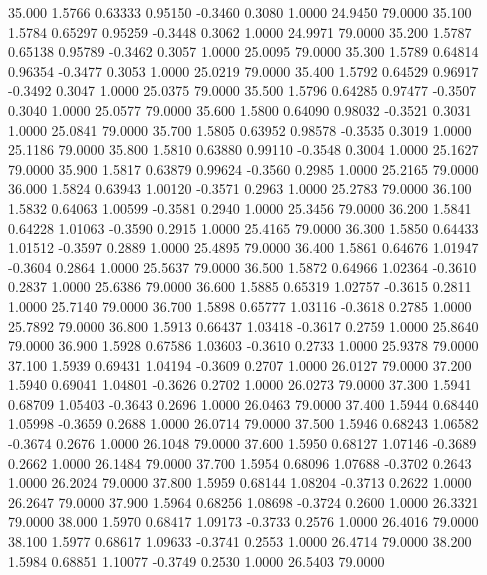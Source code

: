   35.000   1.5766   0.63333   0.95150  -0.3460   0.3080   1.0000  24.9450  79.0000
  35.100   1.5784   0.65297   0.95259  -0.3448   0.3062   1.0000  24.9971  79.0000
  35.200   1.5787   0.65138   0.95789  -0.3462   0.3057   1.0000  25.0095  79.0000
  35.300   1.5789   0.64814   0.96354  -0.3477   0.3053   1.0000  25.0219  79.0000
  35.400   1.5792   0.64529   0.96917  -0.3492   0.3047   1.0000  25.0375  79.0000
  35.500   1.5796   0.64285   0.97477  -0.3507   0.3040   1.0000  25.0577  79.0000
  35.600   1.5800   0.64090   0.98032  -0.3521   0.3031   1.0000  25.0841  79.0000
  35.700   1.5805   0.63952   0.98578  -0.3535   0.3019   1.0000  25.1186  79.0000
  35.800   1.5810   0.63880   0.99110  -0.3548   0.3004   1.0000  25.1627  79.0000
  35.900   1.5817   0.63879   0.99624  -0.3560   0.2985   1.0000  25.2165  79.0000
  36.000   1.5824   0.63943   1.00120  -0.3571   0.2963   1.0000  25.2783  79.0000
  36.100   1.5832   0.64063   1.00599  -0.3581   0.2940   1.0000  25.3456  79.0000
  36.200   1.5841   0.64228   1.01063  -0.3590   0.2915   1.0000  25.4165  79.0000
  36.300   1.5850   0.64433   1.01512  -0.3597   0.2889   1.0000  25.4895  79.0000
  36.400   1.5861   0.64676   1.01947  -0.3604   0.2864   1.0000  25.5637  79.0000
  36.500   1.5872   0.64966   1.02364  -0.3610   0.2837   1.0000  25.6386  79.0000
  36.600   1.5885   0.65319   1.02757  -0.3615   0.2811   1.0000  25.7140  79.0000
  36.700   1.5898   0.65777   1.03116  -0.3618   0.2785   1.0000  25.7892  79.0000
  36.800   1.5913   0.66437   1.03418  -0.3617   0.2759   1.0000  25.8640  79.0000
  36.900   1.5928   0.67586   1.03603  -0.3610   0.2733   1.0000  25.9378  79.0000
  37.100   1.5939   0.69431   1.04194  -0.3609   0.2707   1.0000  26.0127  79.0000
  37.200   1.5940   0.69041   1.04801  -0.3626   0.2702   1.0000  26.0273  79.0000
  37.300   1.5941   0.68709   1.05403  -0.3643   0.2696   1.0000  26.0463  79.0000
  37.400   1.5944   0.68440   1.05998  -0.3659   0.2688   1.0000  26.0714  79.0000
  37.500   1.5946   0.68243   1.06582  -0.3674   0.2676   1.0000  26.1048  79.0000
  37.600   1.5950   0.68127   1.07146  -0.3689   0.2662   1.0000  26.1484  79.0000
  37.700   1.5954   0.68096   1.07688  -0.3702   0.2643   1.0000  26.2024  79.0000
  37.800   1.5959   0.68144   1.08204  -0.3713   0.2622   1.0000  26.2647  79.0000
  37.900   1.5964   0.68256   1.08698  -0.3724   0.2600   1.0000  26.3321  79.0000
  38.000   1.5970   0.68417   1.09173  -0.3733   0.2576   1.0000  26.4016  79.0000
  38.100   1.5977   0.68617   1.09633  -0.3741   0.2553   1.0000  26.4714  79.0000
  38.200   1.5984   0.68851   1.10077  -0.3749   0.2530   1.0000  26.5403  79.0000
